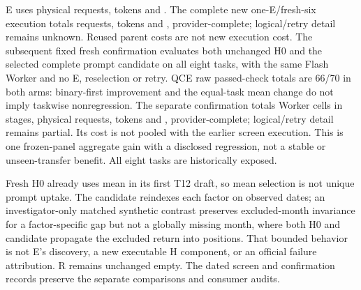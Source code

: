 E uses \ProEvolverForkEvolverRequests{} physical requests,
\ProEvolverForkEvolverTokens{} tokens and \ProEvolverForkEvolverCost{}.
The complete new one-E/fresh-six execution totals
\ProEvolverForkTotalRequests{} requests, \ProEvolverForkTotalTokens{} tokens
and \ProEvolverForkTotalCost{}, provider-complete; logical/retry detail
remains unknown. Reused parent costs are not new execution cost.
The subsequent fixed fresh confirmation evaluates both unchanged H0 and the
selected complete prompt candidate on all eight tasks, with the same Flash
Worker and no E, reselection or retry. 
QCE raw passed-check totals are 66/70 in both arms: binary-first improvement
and the equal-task mean change do not imply taskwise nonregression.
The separate confirmation totals \ProFrozenWorkerCells{} Worker cells in
\ProFrozenStages{} stages, \ProFrozenRequests{} physical requests,
\ProFrozenTokens{} tokens and \ProFrozenCost{}, provider-complete;
logical/retry detail remains partial. Its cost is not pooled with the earlier
\ProEvolverForkTotalCost{} screen execution.
This is one frozen-panel aggregate gain with a disclosed regression, not a
stable or unseen-transfer benefit. All eight tasks are historically exposed.

Fresh H0 already uses mean in its first T12 draft, so mean selection is not
unique prompt uptake. The candidate reindexes each factor on observed dates;
an investigator-only matched synthetic contrast preserves excluded-month
invariance for a factor-specific gap but not a globally missing month, where
both H0 and candidate propagate the excluded return into positions. That
bounded behavior is not E's discovery, a new executable H component, or an
official failure attribution. R remains unchanged empty. The dated screen and
confirmation records preserve the separate comparisons and consumer audits.

